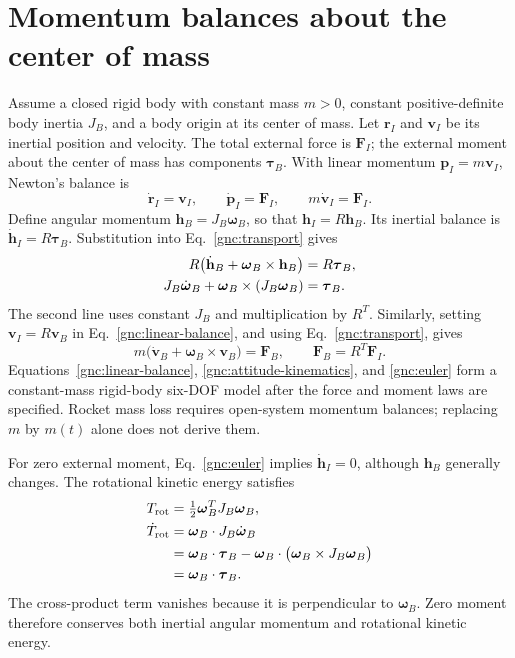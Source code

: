\section{Momentum balances about the center of mass}
Assume a closed rigid body with constant mass $m>0$, constant positive-definite
body inertia $J_B$, and a body origin at its center of mass. Let
$\mathbf r_I$ and $\mathbf v_I$ be its inertial position and velocity.
The total external force is $\mathbf F_I$; the external moment about the
center of mass has components $\boldsymbol\tau_B$.
With linear momentum $\mathbf p_I=m\mathbf v_I$, Newton's balance is
\begin{equation}\label{gnc:linear-balance}
 \dot{\mathbf r}_I=\mathbf v_I,\qquad
 \dot{\mathbf p}_I=\mathbf F_I,\qquad
 m\dot{\mathbf v}_I=\mathbf F_I.
\end{equation}
Define angular momentum $\mathbf h_B=J_B\boldsymbol\omega_B$, so that
$\mathbf h_I=R\mathbf h_B$. Its inertial balance is
$\dot{\mathbf h}_I=R\boldsymbol\tau_B$. Substitution into
Eq.~\eqref{gnc:transport} gives
\begin{align}
 R\bigl(\dot{\mathbf h}_B+
        \boldsymbol\omega_B\times\mathbf h_B\bigr)
   &=R\boldsymbol\tau_B,\notag\\
 J_B\dot{\boldsymbol\omega}_B+
 \boldsymbol\omega_B\times(J_B\boldsymbol\omega_B)
   &=\boldsymbol\tau_B.\label{gnc:euler}
\end{align}
The second line uses constant $J_B$ and multiplication by $R^{T}$.
Similarly, setting $\mathbf v_I=R\mathbf v_B$ in
Eq.~\eqref{gnc:linear-balance}, and using Eq.~\eqref{gnc:transport}, gives
\begin{equation}\label{gnc:body-translation}
 m\bigl(\dot{\mathbf v}_B+
       \boldsymbol\omega_B\times\mathbf v_B\bigr)=\mathbf F_B,
 \qquad \mathbf F_B=R^{T}\mathbf F_I.
\end{equation}
Equations~\eqref{gnc:linear-balance}, \eqref{gnc:attitude-kinematics}, and
\eqref{gnc:euler} form a constant-mass rigid-body six-DOF model after the
force and moment laws are specified. Rocket mass loss requires open-system
momentum balances; replacing $m$ by $m(t)$ alone does not derive them.

For zero external moment, Eq.~\eqref{gnc:euler} implies
$\dot{\mathbf h}_I=0$, although $\mathbf h_B$ generally changes.
The rotational kinetic energy satisfies
\begin{align}
 T_{\mathrm{rot}}&=\tfrac12\boldsymbol\omega_B^{T}
                            J_B\boldsymbol\omega_B,\notag\\
 \dot T_{\mathrm{rot}}
 &=\boldsymbol\omega_B\cdot J_B\dot{\boldsymbol\omega}_B\notag\\
 &=\boldsymbol\omega_B\cdot\boldsymbol\tau_B
 -\boldsymbol\omega_B\cdot
       \bigl(\boldsymbol\omega_B\times J_B\boldsymbol\omega_B\bigr)\notag\\
 &=\boldsymbol\omega_B\cdot\boldsymbol\tau_B.
\end{align}
The cross-product term vanishes because it is perpendicular to
$\boldsymbol\omega_B$. Zero moment therefore conserves both inertial
angular momentum and rotational kinetic energy.


